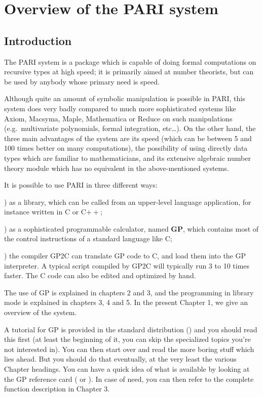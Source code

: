 %
%
\chapter{Overview of the PARI system}

\section{Introduction}

\noindent
The PARI system is a package which is capable of doing formal computations
on recursive types at high speed; it is primarily aimed at number
theorists, but can be used by anybody whose primary need is speed.

Although quite an amount of symbolic manipulation is possible in PARI, this
system does very badly compared to much more sophisticated systems like
Axiom, Macsyma, Maple, Mathematica or Reduce on such manipulations
(e.g.~multivariate polynomials, formal integration, etc\dots). On the other
hand, the three main advantages of the system are its speed (which can be
between 5 and 100 times better on many computations), the possibility of
using directly data types which are familiar to mathematicians, and its
extensive algebraic number theory module which has no equivalent in the
above-mentioned systems.

It is possible to use PARI in three different ways:

) as a library, which can be called from an upper-level language
application, for instance written in C or C$++$;

) as a sophisticated programmable calculator, named {\bf GP}, which
contains most of the control instructions of a standard language like C;

) the compiler GP2C can translate GP code to C, and load them into the
GP interpreter. A typical script compiled by GP2C will typically run 3 to 10
times faster. The C code can also be edited and optimized by hand.

The use of GP is explained in chapters 2 and 3, and the programming in library
mode is explained in chapters 3, 4 and 5. In the present Chapter 1, we give
an overview of the system.

 A tutorial for GP is provided in the standard
distribution () and you should read this first (at
least the beginning of it, you can skip the specialized topics you're not
interested in). You can then start over and read the more boring stuff which
lies ahead. But you should do that eventually, at the very least the various
Chapter headings. You can have a quick idea of what is available by looking
at the GP reference card ( or ). In case
of need, you can then refer to the complete function description in Chapter 3.

